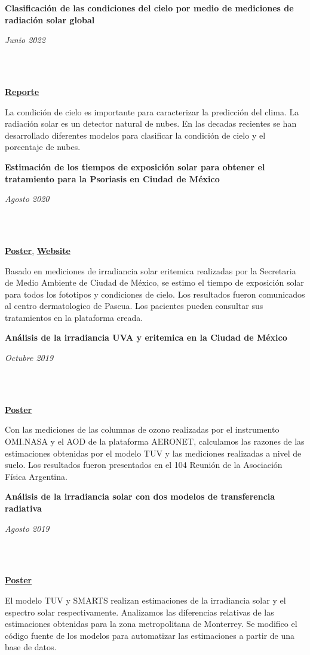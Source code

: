 \documentclass[a3paper]{adcv_color}
\newcommand{\proyect}[3]{\begin{minipage}{1\linewidth}
    \begin{minipage}{0.8\linewidth}
      \textbf{#1}
    \end{minipage}
    \begin{minipage}{0.19\linewidth}
      \begin{flushright}
        \vspace{#3cm}
        \textit{#2}
      \end{flushright}
    \end{minipage}\\
  \end{minipage}
  \vspace{0.1cm}\\
}
\begin{document}
\begin{multicols}{2}
  \proyect{Clasificación de las condiciones del cielo por medio de mediciones de radiación solar global}{Junio 2022}{-0.8}
  \href{https://github.com/giovannilopez9808/Cloud_classification/raw/main/Document/Main.pdf}{\textbf{Reporte}}

  La condición de cielo es importante para caracterizar la predicción del clima. La radiación solar es un detector natural de nubes. En las decadas recientes se han desarrollado diferentes modelos para clasificar la condición de cielo y el porcentaje de nubes.

  \columnbreak

  \proyect{Estimación de los tiempos de exposición solar para obtener el tratamiento para la Psoriasis en Ciudad de México}{Agosto 2020}{-0.2}
  \href{https://github.com/giovannilopez9808/Documents/raw/master/Posters/2020/CNF/TES/main.pdf}{\textbf{Poster}}, \href{http://tes-v1.herokuapp.com/}{\textbf{Website}}

  Basado en mediciones de irradiancia solar eritemica realizadas por la Secretaria de Medio Ambiente de Ciudad de México, se estimo el tiempo de exposición solar para todos los fototipos y condiciones de cielo. Los resultados fueron comunicados al centro dermatologico de Pascua. Los pacientes pueden consultar sus tratamientos en la plataforma creada.\\

  \proyect{Análisis de la irradiancia UVA y eritemica en la Ciudad de México}{Octubre 2019}{-0.2}  \href{https://github.com/giovannilopez9808/Documents/raw/master/Posters/2019/AFA/Analisis%20indice%20UV/Analisis%20de%20irradiancia.pdf}{\textbf{Poster}}

    Con las mediciones de las columnas de ozono realizadas por el instrumento OMI.NASA y el AOD de la plataforma AERONET, calculamos las razones de las estimaciones obtenidas por el modelo TUV y las mediciones realizadas a nivel de suelo. Los resultados fueron presentados en el 104 Reunión de la Asociación Física Argentina.\\

    \proyect{Análisis de la irradiancia solar con dos modelos de transferencia radiativa}{Agosto 2019}{0}
    \href{https://github.com/giovannilopez9808/Documents/raw/master/Posters/2019/CNF/Transferencia%20radiativa/main.pdf}{\textbf{Poster}}

      El modelo TUV y SMARTS realizan estimaciones de la irradiancia solar y el espectro solar respectivamente. Analizamos las diferencias relativas de las estimaciones obtenidas para la zona metropolitana de Monterrey. Se modifico el código fuente de los modelos para automatizar las estimaciones a partir de una base de datos.\\


\end{multicols}
\end{document}
